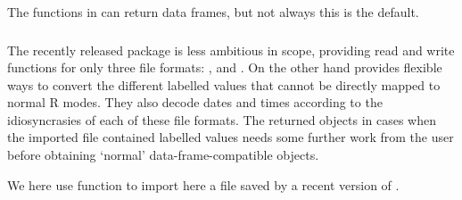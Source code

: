 \documentclass[krantz2,ChapterTOCs]{krantz}\usepackage{knitr}
\begin{document}
The functions in  can return data frames, but not always this is the default.

\subsubsection[haven]{}

The recently released package  is less ambitious in scope, providing read and write functions for only three file formats: ,  and . On the other hand  provides flexible ways to convert the different labelled values that cannot be directly mapped to normal R modes. They also decode dates and times according to the idiosyncrasies of each of these file formats. The returned  objects in cases when the imported file contained labelled values needs some further work from the user before obtaining `normal' data-frame-compatible  objects.

We here use function  to import here a  file saved by a recent version of .
\end{document}
